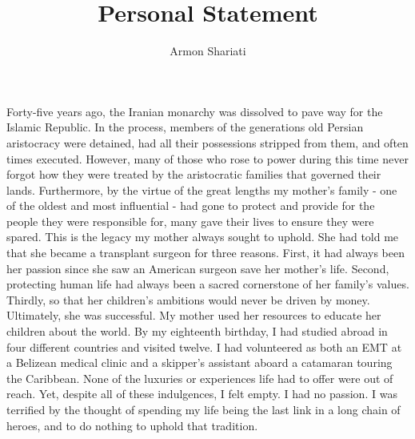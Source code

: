 \documentclass{article}
\begin{document}
\author{Armon Shariati}
\title{Personal Statement}
\date{}
\maketitle

Forty-five years ago, the Iranian monarchy was dissolved to pave way for the
Islamic Republic. In the process, members of the generations old Persian
aristocracy were detained, had all their possessions stripped from them, and
often times executed. However, many of those who rose to power during this time
never forgot how they were treated by the aristocratic families that governed
their lands. Furthermore, by the virtue of the great lengths my mother's family
- one of the oldest and most influential - had gone to protect and provide for
the people they were responsible for, many gave their lives to ensure they were
spared. This is the legacy my mother always sought to uphold. She had told me
that she became a transplant surgeon for three reasons. First, it had always
been her passion since she saw an American surgeon save her mother's life.
Second, protecting human life had always been a sacred cornerstone of her
family's values. Thirdly, so that her children's ambitions would never be
driven by money. Ultimately, she was successful. My mother used her resources
to educate her children about the world.  By my eighteenth birthday, I had
studied abroad in four different countries and visited twelve. I had
volunteered as both an EMT at a Belizean medical clinic and a skipper's
assistant aboard a catamaran touring the Caribbean.  None of the luxuries or
experiences life had to offer were out of reach. Yet, despite all of these
indulgences, I felt empty. I had no passion.  I was terrified by the thought of
spending my life being the last link in a long chain of heroes, and to do
nothing to uphold that tradition.
\end{document}
